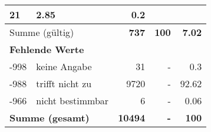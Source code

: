 \begin{longtable}{lXrrr}
       \num{21} &
       \num[round-mode=places,round-precision=2]{2.85} &
         \num[round-mode=places,round-precision=2]{0.2} \\
     \midrule
     \multicolumn{2}{l}{Summe (gültig)} &
       \textbf{\num{737}} &
     \textbf{\num{100}} &
       \textbf{\num[round-mode=places,round-precision=2]{7.02}} \\
     \multicolumn{5}{l}{\textbf{Fehlende Werte}}\\
       -998 &
       keine Angabe &
         \num{31} &
        - &
         \num[round-mode=places,round-precision=2]{0.3} \\
       -988 &
       trifft nicht zu &
         \num{9720} &
        - &
         \num[round-mode=places,round-precision=2]{92.62} \\
       -966 &
       nicht bestimmbar &
         \num{6} &
        - &
         \num[round-mode=places,round-precision=2]{0.06} \\
     \midrule
     \multicolumn{2}{l}{\textbf{Summe (gesamt)}} &
          \textbf{\num{10494}} &
        \textbf{-} &
        \textbf{\num{100}} \\
     \bottomrule
     \end{longtable}
     
